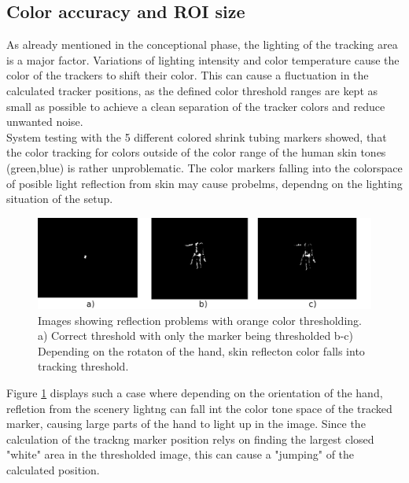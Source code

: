 \subsection{Color accuracy and ROI size}
As already mentioned in the conceptional phase, the lighting of the tracking area is a major factor. Variations of lighting intensity and color temperature cause the color of the trackers to shift their color. This can cause a fluctuation in the calculated tracker positions, as the defined color threshold ranges are kept as small as possible to achieve a clean separation of the tracker colors and reduce unwanted noise. \\
System testing with the 5 different colored shrink tubing markers showed, that the color tracking for colors outside of the color range of the human skin tones (green,blue) is rather unproblematic. The color markers falling into the colorspace of posible light reflection from skin may cause probelms, dependng on the lighting situation of the setup.
\begin{figure}[H]
\includegraphics[width=\textwidth]{images/color_tracking_probs.png}
\caption{Images showing reflection problems with  orange color thresholding. a) Correct threshold with only the marker being thresholded b-c) Depending on the rotaton of the hand, skin reflecton color falls into tracking threshold.}
\label{img:Color_reflecton_problems} 
\end{figure}
Figure \ref{img:Color_reflecton_problems} displays such a case where depending on the orientation of the hand, refletion from the scenery lightng can fall int the color tone space of the tracked marker, causing large parts of the hand to light up in the image. Since the calculation of the trackng marker position relys on finding the largest closed "white" area in the thresholded image, this can cause a "jumping" of the calculated position. 

